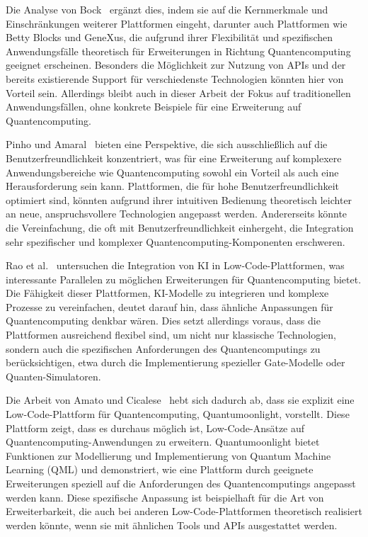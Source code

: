 Die Analyse von Bock~\cite{Bock_2021_essence} ergänzt dies, indem sie auf die Kernmerkmale und Einschränkungen weiterer 
Plattformen eingeht, darunter auch Plattformen wie Betty Blocks und GeneXus, die aufgrund ihrer Flexibilität und 
spezifischen Anwendungsfälle theoretisch für Erweiterungen in Richtung Quantencomputing geeignet erscheinen. Besonders 
die Möglichkeit zur Nutzung von APIs und der bereits existierende Support für verschiedenste Technologien könnten hier 
von Vorteil sein. Allerdings bleibt auch in dieser Arbeit der Fokus auf traditionellen Anwendungsfällen, ohne konkrete 
Beispiele für eine Erweiterung auf Quantencomputing.

Pinho und Amaral~\cite{Pinho_2022} bieten eine Perspektive, die sich ausschließlich auf die Benutzerfreundlichkeit konzentriert, 
was für eine Erweiterung auf komplexere Anwendungsbereiche wie Quantencomputing sowohl ein Vorteil als auch eine Herausforderung 
sein kann. Plattformen, die für hohe Benutzerfreundlichkeit optimiert sind, könnten aufgrund ihrer intuitiven Bedienung theoretisch 
leichter an neue, anspruchsvollere Technologien angepasst werden. Andererseits könnte die Vereinfachung, die oft mit 
Benutzerfreundlichkeit einhergeht, die Integration sehr spezifischer und komplexer Quantencomputing-Komponenten erschweren.

Rao et al.~\cite{rao2024} untersuchen die Integration von KI in Low-Code-Plattformen, was interessante Parallelen zu möglichen 
Erweiterungen für Quantencomputing bietet. Die Fähigkeit dieser Plattformen, KI-Modelle zu integrieren und komplexe Prozesse zu 
vereinfachen, deutet darauf hin, dass ähnliche Anpassungen für Quantencomputing denkbar wären. Dies setzt allerdings voraus, dass 
die Plattformen ausreichend flexibel sind, um nicht nur klassische Technologien, sondern auch die spezifischen Anforderungen des 
Quantencomputings zu berücksichtigen, etwa durch die Implementierung spezieller Gate-Modelle oder Quanten-Simulatoren.

Die Arbeit von Amato und Cicalese~\cite{Amato_2023} hebt sich dadurch ab, dass sie explizit eine Low-Code-Plattform für 
Quantencomputing, Quantumoonlight, vorstellt. Diese Plattform zeigt, dass es durchaus möglich ist, Low-Code-Ansätze auf 
Quantencomputing-Anwendungen zu erweitern. Quantumoonlight bietet Funktionen zur Modellierung und Implementierung von 
Quantum Machine Learning (QML) und demonstriert, wie eine Plattform durch geeignete Erweiterungen speziell auf die Anforderungen 
des Quantencomputings angepasst werden kann. Diese spezifische Anpassung ist beispielhaft für die Art von Erweiterbarkeit, 
die auch bei anderen Low-Code-Plattformen theoretisch realisiert werden könnte, wenn sie mit ähnlichen Tools und APIs ausgestattet werden.

